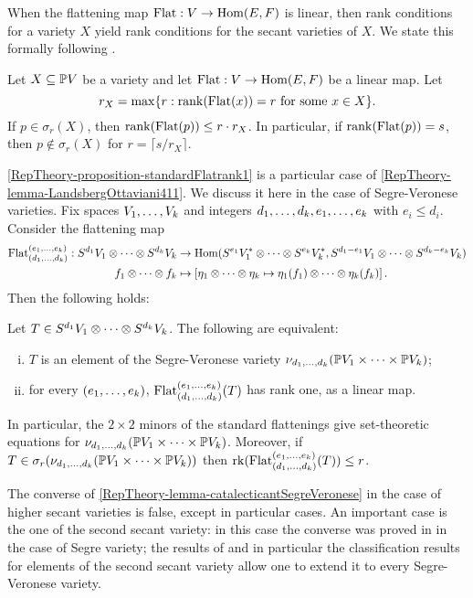 When the flattening map $\mathrm{Flat} : V \to \operatorname{Hom}(E,F)$ is linear, then rank conditions for a variety $X$ yield rank conditions for the secant varieties of $X$. We state this formally following \cite[Prop. 4.1.1]{LO13}.
\begin{lemma}
 \label{RepTheory-lemma-LandsbergOttaviani411}
 Let $X \subseteq \mathbb{P} V$ be a variety and let $\mathrm{Flat} : V \to \operatorname{Hom}(E,F)$ be a linear map. Let 
 \[
 r_X = \max \{ r : \mathrm{rank} ( \mathrm{Flat}(x)) = r \text{ for some $x \in X$}\}.
 \]
If $p \in \sigma_r(X)$, then $\mathrm{rank}(\mathrm{Flat}(p)) \leq r \cdot r_X$. In particular, if $\mathrm{rank}(\mathrm{Flat}(p)) = s$, then $p \notin \sigma_r (X)$ for $r = \lceil s / r_X \rceil$.
\end{lemma}
\ref{RepTheory-proposition-standardFlatrank1} is a particular case of \ref{RepTheory-lemma-LandsbergOttaviani411}. We discuss it here in the case of Segre-Veronese varieties. Fix spaces $V_1 , \ldots , V_k$ and integers $d_1 , \ldots , d_k, e_1 , \ldots , e_k$ with $e_i \leq d_i$. Consider the flattening map 
\[
\begin{aligned}
\mathrm{Flat}_{(d_1 , \ldots , d_k)}^{(e_1 , \ldots , e_k)} : S^{d_1} V_1 \otimes \cdots \otimes S^{d_k}V_k &\to \operatorname{Hom} ( S^{e_1} V_1^* \otimes \cdots \otimes S^{e_k}V_k^* , S^{d_1 - e_1} V_1 \otimes \cdots \otimes S^{d_k- e_k}V_k ) \\ 
f_1 \otimes \cdots \otimes f_k &\mapsto \left[ \eta_1 \otimes \cdots \otimes \eta_k \mapsto  \eta_1(f_1) \otimes \cdots \otimes \eta_k(f_k) \right] .
\end{aligned}
\]
Then the following holds:
\begin{lemma}
\label{RepTheory-lemma-catalecticantSegreVeronese}
 Let $T \in  S^{d_1} V_1 \otimes \cdots \otimes S^{d_k}V_k$. The following are equivalent:
 \begin{enumerate}[(i)]
  \item $T$ is an element of the Segre-Veronese variety $\nu_{d_1 , \ldots , d_k} ( \mathbb{P} V_1 \times \cdots \times \mathbb{P} V_k)$;
  \item for every $(e_1 , \ldots , e_k)$, $\mathrm{Flat}_{(d_1 , \ldots , d_k)}^{(e_1 , \ldots , e_k)}(T)$ has rank one, as a linear map. 
 \end{enumerate}
In particular, the $2 \times 2$ minors of the standard flattenings give set-theoretic equations for $\nu_{d_1 , \ldots , d_k} ( \mathbb{P} V_1 \times \cdots \times \mathbb{P} V_k)$. Moreover, if $T \in \sigma_r(\nu_{d_1 , \ldots , d_k} ( \mathbb{P} V_1 \times \cdots \times \mathbb{P} V_k))$ then $\operatorname{rk}(\mathrm{Flat}_{(d_1 , \ldots , d_k)}^{(e_1 , \ldots , e_k)}(T)) \leq r$.
\end{lemma}
The converse of \ref{RepTheory-lemma-catalecticantSegreVeronese} in the case of higher secant varieties is false, except in particular cases. An important case is the one of the second secant variety: in this case the converse was proved in \cite[Theorem 5.1]{LM04} in the case of Segre variety; the results of \cite{BL14} and in particular the classification results for elements of the second secant variety allow one to extend it to every Segre-Veronese variety.
